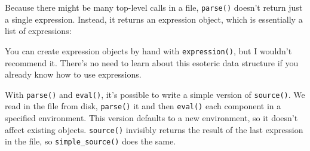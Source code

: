 \begin{Shaded}
\begin{Highlighting}[]
\StringTok{ }\StringTok{ }\StringTok{ }\NormalTok{)}

\NormalTok{(} 
\end{Highlighting}
\end{Shaded}

Because there might be many top-level calls in a file, \texttt{parse()}
doesn't return just a single expression. Instead, it returns an
expression object, which is essentially a list of expressions:

\begin{Shaded}
\begin{Highlighting}[]
\StringTok{ }\NormalTok{(} \NormalTok{(}
\NormalTok{))}

\NormalTok{exp[[}\NormalTok{]]}
\NormalTok{exp[[}\NormalTok{]]}
\end{Highlighting}
\end{Shaded}

You can create expression objects by hand with \texttt{expression()},
but I wouldn't recommend it. There's no need to learn about this
esoteric data structure if you already know how to use expressions.

With \texttt{parse()} and \texttt{eval()}, it's possible to write a
simple version of \texttt{source()}. We read in the file from disk,
\texttt{parse()} it and then \texttt{eval()} each component in a
specified environment. This version defaults to a new environment, so it
doesn't affect existing objects. \texttt{source()} invisibly returns the
result of the last expression in the file, so \texttt{simple\_source()}
does the same. 

